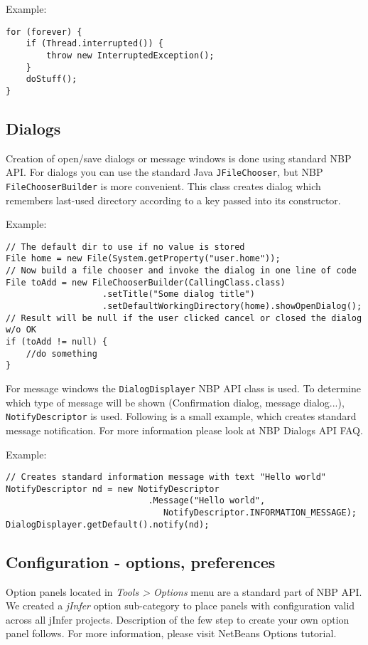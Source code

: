 \documentclass[a4paper,10pt,oneside]{article}
\begin{document}
\noindent Example:
\begin{verbatim}
for (forever) {
    if (Thread.interrupted()) {
        throw new InterruptedException();
    }
    doStuff();
}
\end{verbatim}
\subsection*{Dialogs}
\par 
  Creation of open/save dialogs or message windows is done using standard NBP API.
  For dialogs you can use the standard Java \texttt{JFileChooser},
  but NBP \texttt{FileChooserBuilder}
  is more convenient. This class creates dialog which remembers last-used
  directory according to a key passed into its constructor.

\noindent Example:
\begin{verbatim}
// The default dir to use if no value is stored
File home = new File(System.getProperty("user.home"));
// Now build a file chooser and invoke the dialog in one line of code
File toAdd = new FileChooserBuilder(CallingClass.class)
                   .setTitle("Some dialog title")
                   .setDefaultWorkingDirectory(home).showOpenDialog();
// Result will be null if the user clicked cancel or closed the dialog w/o OK
if (toAdd != null) {
    //do something
}
\end{verbatim}
\par 
  For message windows the \texttt{DialogDisplayer} NBP API
  class is used. To determine which type of message will be shown
  (Confirmation dialog, message dialog...),
  \texttt{NotifyDescriptor}
  is used. Following is a small example, which creates standard message
  notification. For more information please look at
  NBP Dialogs API FAQ.

\noindent Example:
\begin{verbatim}
// Creates standard information message with text "Hello world"
NotifyDescriptor nd = new NotifyDescriptor
                            .Message("Hello world",
                               NotifyDescriptor.INFORMATION_MESSAGE);
DialogDisplayer.getDefault().notify(nd);
\end{verbatim}
\subsection*{Configuration - options, preferences}
\par 
  Option panels located in \textit{Tools > Options} menu are a standard part of
  NBP API. We created a \textit{jInfer} option sub-category to place panels with
  configuration valid across all jInfer projects. Description of the few step
  to create your own option panel follows. For more information, please visit
  NetBeans Options tutorial.
\end{document}
